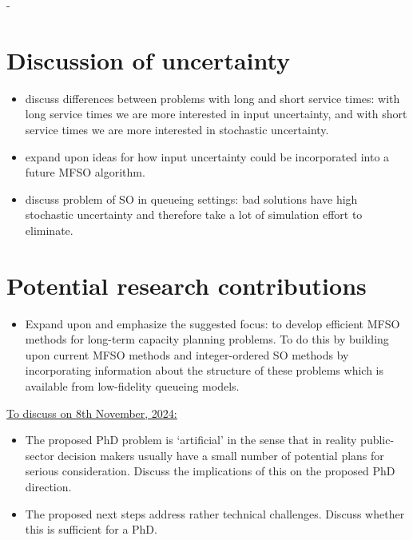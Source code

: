 \documentclass[12pt,a4paper]{article}
\begin{document}
- 

\section{Discussion of uncertainty} \label{uncert}
%
\begin{itemize}[noitemsep]
\item discuss differences between problems with long and short service times: with long service times we are more interested in input uncertainty, and with short service times we are more interested in stochastic uncertainty.
\item expand upon ideas for how input uncertainty could be incorporated into a future MFSO algorithm.
\item discuss problem of SO in queueing settings: bad solutions have high stochastic uncertainty and therefore take a lot of simulation effort to eliminate. 
\end{itemize}
%
\section{Potential research contributions} \label{mfso}
\begin{itemize}
\item Expand upon and emphasize the suggested focus: to develop efficient MFSO methods for long-term capacity planning problems. To do this by building upon current MFSO methods and integer-ordered SO methods by incorporating information about the structure of these problems which is available from low-fidelity queueing models. 
\end{itemize}
%
\underline{To discuss on 8th November, 2024:}
\begin{itemize}[noitemsep]
\item The proposed PhD problem is `artificial' in the sense that in reality public-sector decision makers usually have a small number of potential plans for serious consideration. Discuss the implications of this on the proposed PhD direction.
\item The proposed next steps address rather technical challenges. Discuss whether this is sufficient for a PhD.
\end{itemize}
%
\end{document}
